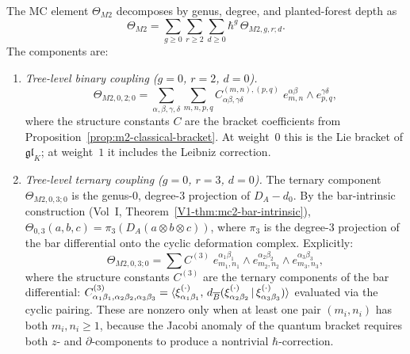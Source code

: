 \begin{theorem}
The MC element $\Theta_{M2}$ decomposes by genus, degree, and
planted-forest depth as
\begin{equation}%
\Theta_{M2}
= \sum_{g\ge 0}\sum_{r\ge 2}\sum_{d\ge 0}
\hbar^g\,\Theta_{M2,g,r;d}.
\end{equation}
The components are:
\begin{enumerate}[label=(\roman*),leftmargin=1.8em]
\item \emph{Tree-level binary coupling ($g=0$, $r=2$, $d=0$).}
\begin{equation}%
\Theta_{M2,0,2;0}
= \sum_{\alpha,\beta,\gamma,\delta}
\sum_{m,n,p,q}
C^{(m,n),(p,q)}_{\alpha\beta,\gamma\delta}\;
e^{\alpha\beta}_{m,n}\wedge e^{\gamma\delta}_{p,q},
\end{equation}
where the structure constants $C$ are the bracket
coefficients from Proposition~\ref{prop:m2-classical-bracket}.
At weight~$0$ this is the Lie bracket of $\mathfrak{gl}_K$;
at weight~$1$ it includes the Leibniz correction.

\item \emph{Tree-level ternary coupling ($g=0$, $r=3$, $d=0$).}
The ternary component $\Theta_{M2,0,3;0}$ is the genus-$0$,
degree-$3$ projection of $D_A - d_0$. By the bar-intrinsic
construction (Vol~I, Theorem~\ref*{V1-thm:mc2-bar-intrinsic}),
$\Theta_{0,3}(a,b,c) = \pi_3(D_A(a\otimes b\otimes c))$,
where $\pi_3$ is the degree-$3$ projection of the bar differential
onto the cyclic deformation complex. Explicitly:
\begin{equation}%
\Theta_{M2,0,3;0}
= \sum C^{(3)}\;
e^{\alpha_1\beta_1}_{m_1,n_1}\wedge
e^{\alpha_2\beta_2}_{m_2,n_2}\wedge
e^{\alpha_3\beta_3}_{m_3,n_3},
\end{equation}
where the structure constants $C^{(3)}$ are the ternary
components of the bar differential:
$C^{(3)}_{\alpha_1\beta_1,\alpha_2\beta_2,\alpha_3\beta_3}
= \langle \xi^{(\cdot)}_{\alpha_1\beta_1},\,
d_{\overline{B}}(\xi^{(\cdot)}_{\alpha_2\beta_2}
\,|\,\xi^{(\cdot)}_{\alpha_3\beta_3})\rangle$
evaluated via the cyclic pairing. These are nonzero only
when at least one pair $(m_i,n_i)$ has both $m_i,n_i\ge 1$,
because the Jacobi anomaly of the quantum bracket requires
both $z$- and $\partial$-components to produce a nontrivial
$\hbar$-correction.


\end{enumerate}
\end{theorem}
